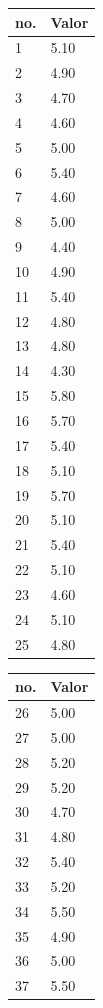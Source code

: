 \begin{table}[!ht]
\centering

\begin{tabular}{|l|l|}
\hline 
 no. & Valor \\ \hline
1	&	5.10	\\ \hline
2	&	4.90	\\ \hline
3	&	4.70	\\ \hline
4	&	4.60	\\ \hline
5	&	5.00	\\ \hline
6	&	5.40	\\ \hline
7	&	4.60	\\ \hline
8	&	5.00	\\ \hline
9	&	4.40	\\ \hline
10	&	4.90	\\ \hline
11	&	5.40	\\ \hline
12	&	4.80	\\ \hline
13	&	4.80	\\ \hline
14	&	4.30	\\ \hline
15	&	5.80	\\ \hline
16	&	5.70	\\ \hline
17	&	5.40	\\ \hline
18	&	5.10	\\ \hline
19	&	5.70	\\ \hline
20	&	5.10	\\ \hline
21	&	5.40	\\ \hline
22	&	5.10	\\ \hline
23	&	4.60	\\ \hline
24	&	5.10	\\ \hline
25	&	4.80	\\ \hline
\end{tabular}
\begin{tabular}{ |l|l| }
\hline
 no. & Valor \\ \hline
26	&	5.00	\\ \hline
27	&	5.00	\\ \hline
28	&	5.20	\\ \hline
29	&	5.20	\\ \hline
30	&	4.70	\\ \hline
31	&	4.80	\\ \hline
32	&	5.40	\\ \hline
33	&	5.20	\\ \hline
34	&	5.50	\\ \hline
35	&	4.90	\\ \hline
36	&	5.00	\\ \hline
37	&	5.50	\\ \hline

\end{tabular}
\end{table}
